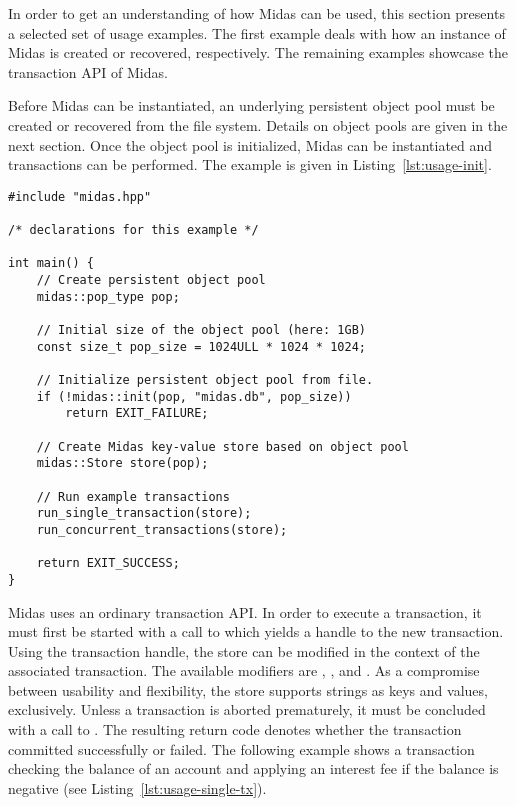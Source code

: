In order to get an understanding of how Midas can be used, this section presents
a selected set of usage examples. The first example deals with how an instance
of Midas is created or recovered, respectively. The remaining examples showcase
the transaction API of Midas.

Before Midas can be instantiated, an underlying persistent object pool must be
created or recovered from the file system. Details on object pools are given in
the next section. Once the object pool is initialized, Midas can be instantiated
and transactions can be performed. The example is given in
Listing~\ref{lst:usage-init}.

\begin{lstlisting}[caption={Midas Bootstrapping.},captionpos=b, label=lst:usage-init]
#include "midas.hpp"

/* declarations for this example */

int main() {
    // Create persistent object pool
    midas::pop_type pop;

    // Initial size of the object pool (here: 1GB)
    const size_t pop_size = 1024ULL * 1024 * 1024;

    // Initialize persistent object pool from file.
    if (!midas::init(pop, "midas.db", pop_size))
        return EXIT_FAILURE;

    // Create Midas key-value store based on object pool
    midas::Store store(pop);

    // Run example transactions
    run_single_transaction(store);
    run_concurrent_transactions(store);

    return EXIT_SUCCESS;
}
\end{lstlisting}

Midas uses an ordinary transaction API. In order to execute a transaction, it
must first be started with a call to  which yields a handle
to the new transaction. Using the transaction handle, the store can be modified
in the context of the associated transaction. The available modifiers are
, , and . As a
compromise between usability and flexibility, the store supports strings as keys
and values, exclusively. Unless a transaction is aborted prematurely, it must
be concluded with a call to . The resulting return code
denotes whether the transaction committed successfully or failed. The following
example shows a transaction checking the balance of an account and applying an
interest fee if the balance is negative (see Listing~\ref{lst:usage-single-tx}).

